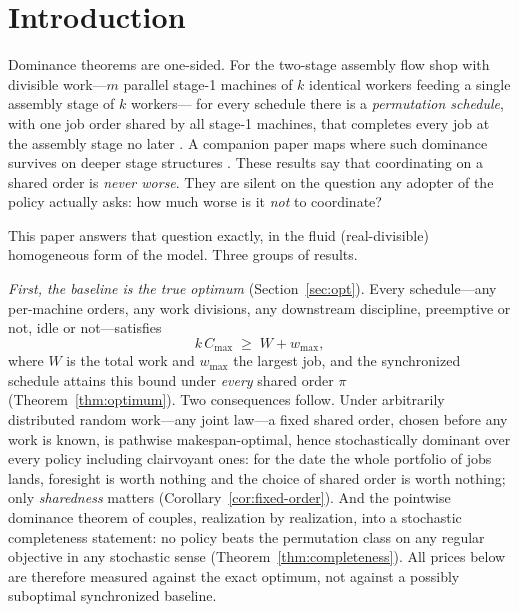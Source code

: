 \documentclass[sn-mathphys,NameDate]{sn-jnl}
\theoremstyle{thmstyleone}
\theoremstyle{thmstylethree}
\theoremstyle{thmstyletwo}
\begin{document}
\section{Introduction}
\label{sec:intro}

Dominance theorems are one-sided. For the two-stage assembly flow
shop with divisible work---$m$ parallel stage-1 machines of $k$
identical workers feeding a single assembly stage of $k$ workers---%
for every schedule there is a \emph{permutation schedule}, with one
job order shared by all stage-1 machines, that completes every job
at the assembly stage no later \citep{bowmanA}. A companion paper
maps where such dominance survives on deeper stage structures
\citep{bowmanB}. These results say that coordinating on a shared
order is \emph{never worse}. They are silent on the question any
adopter of the policy actually asks: how much worse is it \emph{not}
to coordinate?

This paper answers that question exactly, in the fluid
(real-divisible) homogeneous form of the model. Three groups of
results.

\emph{First, the baseline is the true optimum} (Section~\ref{sec:opt}).
Every schedule---any per-machine orders, any work divisions, any
downstream discipline, preemptive or not, idle or not---satisfies
\[
  k \, C_{\max} \;\ge\; W + w_{\max},
\]
where $W$ is the total work and $w_{\max}$ the largest job, and the
synchronized schedule attains this bound under \emph{every} shared
order $\pi$ (Theorem~\ref{thm:optimum}). Two consequences follow.
Under arbitrarily distributed random work---any joint law---a fixed
shared order, chosen before any work is known, is pathwise
makespan-optimal, hence stochastically dominant over every policy
including clairvoyant ones: for the date the whole portfolio of jobs
lands, foresight is worth nothing and the choice of shared order is
worth nothing; only \emph{sharedness} matters
(Corollary~\ref{cor:fixed-order}). And the pointwise dominance
theorem of \citet{bowmanA} couples, realization by realization, into
a stochastic completeness statement: no policy beats the permutation
class on any regular objective in any stochastic sense
(Theorem~\ref{thm:completeness}). All prices below are therefore
measured against the exact optimum, not against a possibly
suboptimal synchronized baseline.
\end{document}
